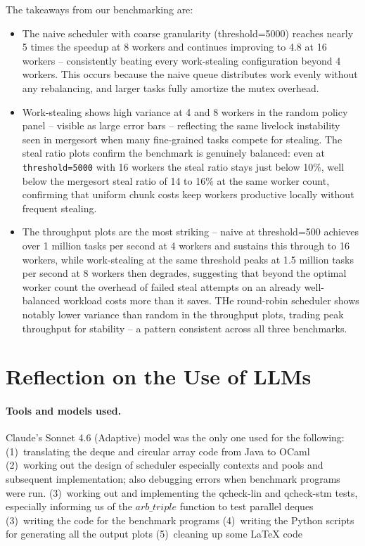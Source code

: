 \documentclass[11pt,a4paper]{article}
\begin{document}
The takeaways from our benchmarking are:
\begin{itemize}
    \item The naive scheduler with coarse granularity (threshold=5000) reaches
        nearly 5 times the speedup at 8 workers and continues improving to 4.8
        at 16 workers -- consistently beating every work-stealing configuration
        beyond 4 workers. This occurs because the naive queue distributes work evenly
        without any rebalancing, and larger tasks fully amortize the mutex overhead.
    \item Work-stealing shows high variance at 4 and 8 workers
        in the random policy panel -- visible as large error bars -- reflecting the
        same livelock instability seen in mergesort when many fine-grained tasks
        compete for stealing. The steal ratio plots confirm the benchmark is
        genuinely balanced: even at \texttt{threshold=5000} with 16 workers
        the steal ratio stays just below 10\%, well below the mergesort steal
        ratio of 14 to 16\% at the same worker count, confirming that uniform
        chunk costs keep workers productive locally without frequent stealing.
     \item The throughput plots are the most striking -- naive at threshold=500
         achieves over 1 million tasks per second at 4 workers and sustains this
         through to 16 workers, while work-stealing at the same threshold peaks
         at 1.5 million tasks per second at 8 workers then degrades, suggesting
         that beyond the optimal worker count
         the overhead of failed steal attempts on an already well-balanced workload
         costs more than it saves. THe round-robin scheduler shows notably
         lower variance than random in the throughput plots,
         trading peak throughput for stability -- a pattern consistent across all
         three benchmarks.
 \end{itemize}


\section{Reflection on the Use of LLMs}
\label{sec:llm}

\paragraph{Tools and models used.}
Claude's Sonnet 4.6 (Adaptive) model was the only one used for the following:
     (1)~translating the deque and circular array code from Java to OCaml
     (2)~working out the design of scheduler especially contexts and pools and
     subsequent implementation; also debugging errors when benchmark programs were run.
     (3)~working out and implementing the qcheck-lin and qcheck-stm tests,
     especially informing us of the $arb\_triple$ function to test parallel deques
     (3)~writing the code for the benchmark programs
     (4)~writing the Python scripts for generating all the output plots
     (5)~cleaning up some LaTeX code
\end{document}
